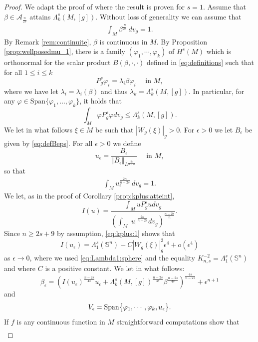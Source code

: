 \documentclass[10pt]{amsart}
\numberwithin{equation}{section}
\def\La{{\Lambda}}
\def\be{{\beta}}
\def\la{{\lambda}}
\def\ep{{\varepsilon}}
\def\span{{\mathop{\rm Span}}}
\newcommand{\vp}{\varphi}
\def \ep{\epsilon}
\theoremstyle{plain}
\theoremstyle{remark}
\begin{document}
\begin{proof}
We adapt the proof of \cite[Theorem 5.4]{AmmannHumbert} where the result is proven for $s=1$. Assume that $\beta \in \mathcal{A}_{\frac{n}{2s}}$ attains $\Lambda_k^s(M,[g])$. Without loss of generality we can assume that
\begin{eqnarray} \label{intv}
\int_M \beta^{\frac{n}{2s}} \,dv_g = 1.
\end{eqnarray}
By Remark \ref{rem:continuite}, $\beta$ is continuous in $M$. By Proposition \ref{prop:wellposedmu_1}, there is a family $(\vp_1,\cdots,\vp_k)$ of $H^s(M)$ which is orthonormal for the scalar product $B(\beta, \cdot, \cdot)$ defined in \eqref{eq:definitions} such  that for all  $1 \le i \le k$ 
$$P_g^s \vp_i = \la_i \beta \vp_i \quad \text{ in } M,$$
where we have let $\la_i=\la_i(\beta)$ and thus $\la_k= \La_k^s(M,[g])$. In particular, for any $\vp \in \text{Span} \{\vp_1, \dots, \vp_k\} $, it holds that 
\begin{equation} \label{estiv}
 \int_M \vp P^s_g \vp dv_g \leq \La_k^s(M,[g]). 
\end{equation}
We let in what follows $\xi \in M$ be such that $|W_g(\xi)|_g >0$. For $\ep >0$ we let $B_\ep$ be given by \eqref{eq:defBeps}. For all $\ep >0$ we  define 
$$u_\ep = \frac{B_\ep}{\Vert B_\ep \Vert_{L^\frac{2n}{n-2s}}} \quad \text{ in } M,$$
so that 
\begin{eqnarray} \label{intve}
\int_M u_{\ep}^{\frac{2n}{n-2s}} \,dv_g = 1.
\end{eqnarray}
We let, as in the proof of Corollary \ref{prop:kplus:atteint},
$$ I(u) = \frac{\int_M u P_g^su dv_g}{\left( \int_M |u|^{\frac{2n}{n-2s}} dv_g \right)^{\frac{n-2s}{n}}}. $$
Since $n \ge 2s+9$ by assumption, \eqref{eq:kplus:1} shows that 
\begin{equation} \label{eq:klarge:1}
I(u_\ep) = \Lambda_1^s(\mathbb{S}^n)- C |W_g(\xi)|_g^2  \ep^4 + o(\ep^4) 
\end{equation}
as $\ep \to 0$, where we used \eqref{eq:Lambda1:sphere} and the equality $K_{n,s}^{-2} = \Lambda_1^s(\mathbb{S}^n)$ and where $C$ is a positive constant. We let in what follows:
$$ \beta_\ep =\left( I(u_{\ep})^{\frac{n-2s}{4s}}  u_{\ep} + \La_k^s(M,[g])^{\frac{n-2s}{4s}} \be^{\frac{n-2s}{4s}} \right)^{\frac{4s}{n-2s}} + \ep^{n+1}$$
and
$$V_\ep= \span \big\{ \vp_1,\cdots, \vp_k, u_\ep \big\} . $$
If $f$ is any continuous function in $M$ straightforward computations show that 
\begin{equation}  \label{eq:klarge:2}
\begin{aligned}

\end{aligned}
\end{equation}
\end{proof}
\end{document}
